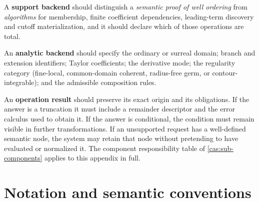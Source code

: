 \documentclass[11pt,letterpaper]{article}
\numberwithin{equation}{section}
\theoremstyle{definition}
\theoremstyle{remark}
\begin{document}
A \textbf{support backend} should distinguish a \emph{semantic proof of well
ordering} from \emph{algorithms} for membership, finite coefficient
dependencies, leading-term discovery and cutoff materialization, and it should
declare which of those operations are total.

An \textbf{analytic backend} should specify the ordinary or surreal domain;
branch and extension identifiers; Taylor coefficients; the derivative mode; the
regularity category (fine-local, common-domain coherent, radius-free germ, or
contour-integrable); and the admissible composition rules.

An \textbf{operation result} should preserve its exact origin and its
obligations. If the answer is a truncation it must include a remainder
descriptor and the error calculus used to obtain it. If the answer is
conditional, the condition must remain visible in further transformations. If an
unsupported request has a well-defined semantic node, the system may retain that
node without pretending to have evaluated or normalized it. The component
responsibility table of \cref{cas:sub-components} applies to this appendix in
full.

\section{Notation and semantic conventions}
\label{cas:app-notation}
\end{document}
